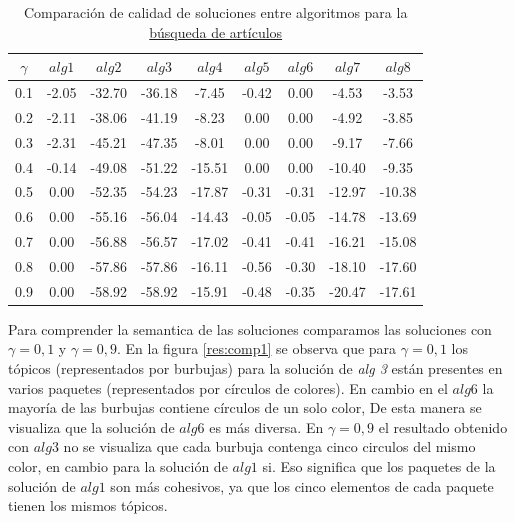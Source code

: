 \begin{table}[H]
\begin{center}
\begin{tabular}{|c|c|c|c|c|c|c|c|c|}
\hline
$\gamma$&$alg1$&$alg2$&$alg3$&$alg4$&$alg5$&$alg6$&$alg7$&$alg8$ \\ \hline
0.1 & -2.05 & -32.70 & -36.18 & -7.45 & -0.42 & 0.00 & -4.53 & -3.53 \\
0.2 & -2.11 & -38.06 & -41.19 & -8.23 & 0.00 & 0.00 & -4.92 & -3.85 \\
0.3 & -2.31 & -45.21 & -47.35 & -8.01 & 0.00 & 0.00 & -9.17 & -7.66 \\
0.4 & -0.14 & -49.08 & -51.22 & -15.51 & 0.00 & 0.00 & -10.40 & -9.35 \\
0.5 & 0.00 & -52.35 & -54.23 & -17.87 & -0.31 & -0.31 & -12.97 & -10.38 \\
0.6 & 0.00 & -55.16 & -56.04 & -14.43 & -0.05 & -0.05 & -14.78 & -13.69 \\
0.7 & 0.00 & -56.88 & -56.57 & -17.02 & -0.41 & -0.41 & -16.21 & -15.08 \\
0.8 & 0.00 & -57.86 & -57.86 & -16.11 & -0.56 & -0.30 & -18.10 & -17.60 \\
0.9 & 0.00 & -58.92 & -58.92 & -15.91 & -0.48 & -0.35 & -20.47 & -17.61 \\ \hline 
\end{tabular}
\caption{Comparación de calidad de soluciones entre algoritmos para la \hyperref[busqueda:articulos]{búsqueda de artículos}} 
\label{tabla:comp1}
\end{center}
\end{table}

Para comprender la semantica de las soluciones comparamos las soluciones con $\gamma = 0,1$ y $\gamma = 0,9$. En la figura \ref{res:comp1} se observa que para $\gamma = 0,1$ los tópicos (representados por burbujas) para la solución de \textit{alg 3} están presentes en varios paquetes (representados por círculos de colores). En cambio en el $alg6$ la mayoría de las burbujas contiene círculos de un solo color, De esta manera se visualiza que la solución de $alg6$ es más diversa. En $\gamma = 0,9$ el resultado obtenido con $alg3$ no se visualiza que cada burbuja contenga cinco circulos del mismo color, en cambio para la solución de $alg1$ si. Eso significa que los paquetes de la solución de $alg1$ son más cohesivos, ya que los cinco elementos de cada paquete tienen los mismos tópicos.

